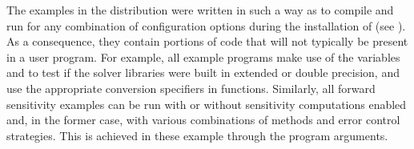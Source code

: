 \vspace{0.2in}
The examples in the {\idas} distribution were written in such a way as
to compile and run for any combination of configuration options during
the installation of {\sundials} (see ). As a consequence,
they contain portions of code that will not typically be present in a
user program. For example, all example programs make use of the
variables  and 
to test if the solver libraries
were built in extended or double precision, and use the appropriate conversion 
specifiers in  functions. Similarly, all forward sensitivity
examples can be run with or without sensitivity computations enabled and,
in the former case, with various combinations of methods and error control 
strategies. This is achieved in these example through the program arguments.

